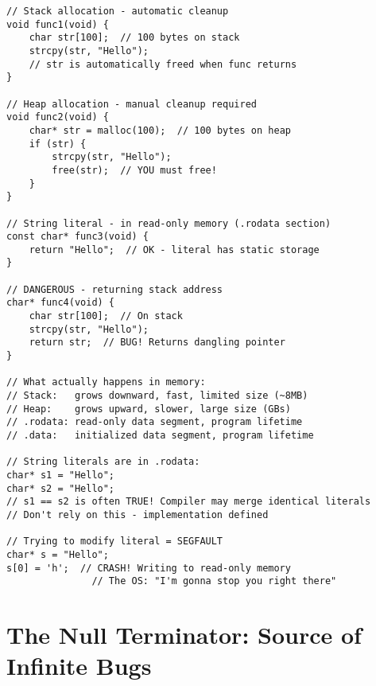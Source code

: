\begin{lstlisting}
// Stack allocation - automatic cleanup
void func1(void) {
    char str[100];  // 100 bytes on stack
    strcpy(str, "Hello");
    // str is automatically freed when func returns
}

// Heap allocation - manual cleanup required
void func2(void) {
    char* str = malloc(100);  // 100 bytes on heap
    if (str) {
        strcpy(str, "Hello");
        free(str);  // YOU must free!
    }
}

// String literal - in read-only memory (.rodata section)
const char* func3(void) {
    return "Hello";  // OK - literal has static storage
}

// DANGEROUS - returning stack address
char* func4(void) {
    char str[100];  // On stack
    strcpy(str, "Hello");
    return str;  // BUG! Returns dangling pointer
}

// What actually happens in memory:
// Stack:   grows downward, fast, limited size (~8MB)
// Heap:    grows upward, slower, large size (GBs)
// .rodata: read-only data segment, program lifetime
// .data:   initialized data segment, program lifetime

// String literals are in .rodata:
char* s1 = "Hello";
char* s2 = "Hello";
// s1 == s2 is often TRUE! Compiler may merge identical literals
// Don't rely on this - implementation defined

// Trying to modify literal = SEGFAULT
char* s = "Hello";
s[0] = 'h';  // CRASH! Writing to read-only memory
               // The OS: "I'm gonna stop you right there"
\end{lstlisting}

\section{The Null Terminator: Source of Infinite Bugs}

